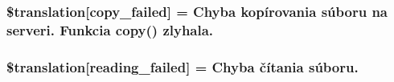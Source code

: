 \subsubsection[{\$translation}]{\setlength{\rightskip}{0pt plus 5cm}\$translation\mbox{[}\textquotesingle{}copy\+\_\+failed\textquotesingle{}\mbox{]} = \textquotesingle{}Chyba kopírovania súboru na serveri. Funkcia copy() zlyhala.\textquotesingle{}}\label{class_8upload_8sk___s_k_8php_a783c9358bcf54a054545b50098bc679b}
\hypertarget{class_8upload_8sk___s_k_8php_a01bea14c9fd5f353f62db44beabfcd42}{}
\subsubsection[{\$translation}]{\setlength{\rightskip}{0pt plus 5cm}\$translation\mbox{[}\textquotesingle{}reading\+\_\+failed\textquotesingle{}\mbox{]} = \textquotesingle{}Chyba čítania súboru.\textquotesingle{}}\label{class_8upload_8sk___s_k_8php_a01bea14c9fd5f353f62db44beabfcd42}
